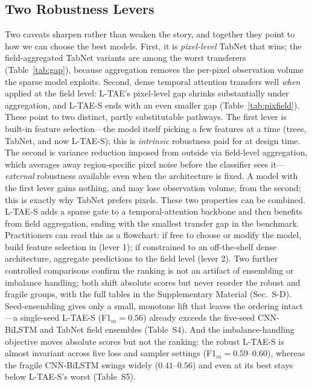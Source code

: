 \documentclass[journal]{IEEEtran}
\begin{document}
\subsection{Two Robustness Levers}
Two caveats sharpen rather than weaken the story, and together they point to how we can choose the best models. First, it is \emph{pixel-level} TabNet that wins; the field-aggregated TabNet variants are among the worst transferers (Table~\ref{tab:gap}), because aggregation removes the per-pixel observation volume the sparse model exploits. Second, dense temporal attention transfers well \emph{when} applied at the field level: L-TAE's pixel-level gap shrinks substantially under aggregation, and L-TAE-S ends with an even smaller gap (Table~\ref{tab:pixfield}). These point to two distinct, partly substitutable pathways. The first lever is built-in feature selection---the model itself picking a few features at a time (trees, TabNet, and now L-TAE-S); this is \emph{intrinsic} robustness paid for at design time. The second is variance reduction imposed from outside via field-level aggregation, which averages away region-specific pixel noise before the classifier sees it---\emph{external} robustness available even when the architecture is fixed. A model with the first lever gains nothing, and may lose observation volume, from the second; this is exactly why TabNet prefers pixels. These two properties can be combined. L-TAE-S adds a sparse gate to a temporal-attention backbone and then benefits from field aggregation, ending with the smallest transfer gap in the benchmark. Practitioners can read this as a flowchart: if free to choose or modify the model, build feature selection in (lever 1); if constrained to an off-the-shelf dense architecture, aggregate predictions to the field level (lever 2). Two further controlled comparisons confirm the ranking is not an artifact of ensembling or imbalance handling; both shift absolute scores but never reorder the robust and fragile groups, with the full tables in the Supplementary Material (Sec.~S-D). Seed-ensembling gives only a small, monotone lift that leaves the ordering intact---a single-seed L-TAE-S (F1$_m=0.56$) already exceeds the five-seed CNN-BiLSTM and TabNet field ensembles (Table~S4). And the imbalance-handling objective moves absolute scores but not the ranking: the robust L-TAE-S is almost invariant across five loss and sampler settings (F1$_m=0.59$--$0.60$), whereas the fragile CNN-BiLSTM swings widely ($0.41$--$0.56$) and even at its best stays below L-TAE-S's worst (Table~S5).
\end{document}
